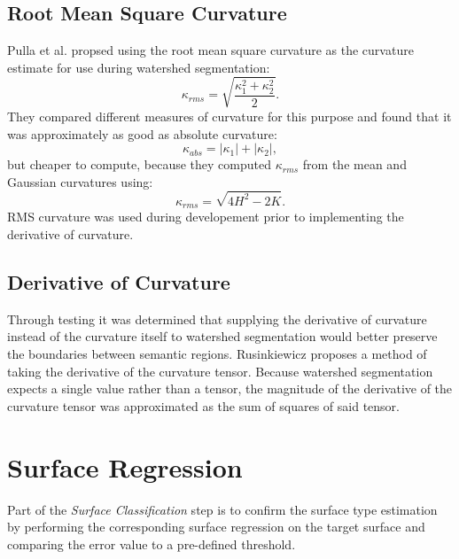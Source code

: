 \subsection{Root Mean Square Curvature}
Pulla et al. propsed using the root mean square curvature as the curvature estimate for use during watershed segmentation:
\begin{equation}
	\kappa_{rms} = \sqrt{\frac{\kappa_1^2 + \kappa_2^2}{2}}.
\end{equation}
They compared different measures of curvature for this purpose and found that it was approximately as good as absolute curvature:
\begin{equation}
	\kappa_{abs} = |\kappa_1| + |\kappa_2|,
\end{equation}
but cheaper to compute, because they computed $\kappa_{rms}$ from the mean and Gaussian curvatures using:
\begin{equation}
	\kappa_{rms} = \sqrt{4H^2 - 2K}.
\end{equation}
RMS curvature was used during developement prior to implementing the derivative of curvature.

\subsection{Derivative of Curvature}
Through testing it was determined that supplying the derivative of curvature instead of the curvature itself to watershed segmentation would better preserve the boundaries between semantic regions.
Rusinkiewicz proposes a method of taking the derivative of the curvature tensor\cite{SRTensor}.
Because watershed segmentation expects a single value rather than a tensor, the magnitude of the derivative of the curvature tensor was approximated as the sum of squares of said tensor.

\section{Surface Regression}
Part of the \textit{Surface Classification} step is to confirm the surface type estimation by performing the corresponding surface regression on the target surface and comparing the error value to a pre-defined threshold.

